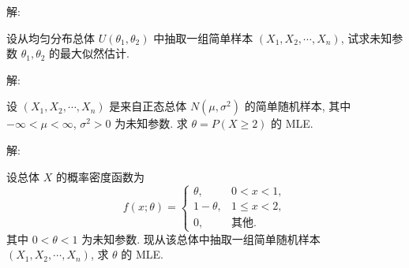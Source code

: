 \documentclass[standard]{ExBook}
\begin{document}
\begin{qitems}
\vspace{-5em}

    \begin{bbox}
解: 
    \end{bbox}

\vspace{-5em}

    \begin{bbox}
    \begin{shaded}
        \qitem
设从均匀分布总体 \(U(\theta_1, \theta_2)\) 中抽取一组简单样本 \((X_1, X_2, \cdots, X_n)\), 试求未知参数 \(\theta_1, \theta_2\) 的最大似然估计.
    \end{shaded}
    \end{bbox}

\vspace{-5em}

    \begin{bbox}
解: 
    \end{bbox}

\vspace{-5em}

    \begin{bbox}
    \begin{shaded}
        \qitem
设 \((X_1, X_2, \cdots, X_n)\) 是来自正态总体 \(N(\mu, \sigma^2)\) 的简单随机样本, 其中 \(-\infty < \mu < \infty\), \(\sigma^2 > 0\) 为未知参数. 求 \(\theta = P(X \geq 2)\) 的 MLE.
    \end{shaded}
    \end{bbox}

\vspace{-5em}

    \begin{bbox}
解: 
    \end{bbox}

\vspace{-5em}

    \begin{bbox}
    \begin{shaded}
        \qitem
设总体 \(X\) 的概率密度函数为
\[f(x; \theta) =
\begin{cases} 
\theta, & 0 < x < 1, \\
1 - \theta, & 1 \leq x < 2, \\
0, & \text{其他}.
\end{cases}\]
其中 \(0 < \theta < 1\) 为未知参数. 现从该总体中抽取一组简单随机样本 \((X_1, X_2, \cdots, X_n)\), 求 \(\theta\) 的 MLE.
    \end{shaded}
    \end{bbox}


\end{qitems}
\end{document}
